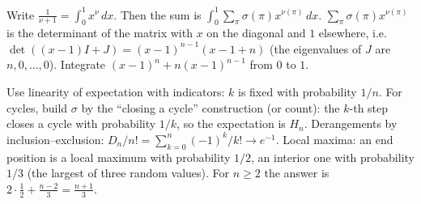 \documentclass[11pt,a4paper]{article}
\begin{document}
 Write $\frac1{\nu+1}=\int_0^1x^{\nu}\,dx$. Then the sum is $\int_0^1\sum_\pi\sigma(\pi)x^{\nu(\pi)}\,dx$.
 $\sum_\pi\sigma(\pi)x^{\nu(\pi)}$ is the determinant of the matrix with $x$ on the diagonal and $1$ elsewhere, i.e.\ $\det((x-1)I+J)=(x-1)^{n-1}(x-1+n)$ (the eigenvalues of $J$ are $n,0,\dots,0$).
 Integrate $(x-1)^n+n(x-1)^{n-1}$ from $0$ to $1$.

 Use linearity of expectation with indicators: $k$ is fixed with probability $1/n$. For cycles, build $\sigma$ by the ``closing a cycle'' construction (or count): the $k$-th step closes a cycle with probability $1/k$, so the expectation is $H_n$.
 Derangements by inclusion--exclusion: $D_n/n!=\sum_{k=0}^n(-1)^k/k!\to e^{-1}$.
 Local maxima: an end position is a local maximum with probability $1/2$, an interior one with probability $1/3$ (the largest of three random values). For $n\ge2$ the answer is $2\cdot\frac12+\frac{n-2}3=\frac{n+1}3$.
\end{document}
